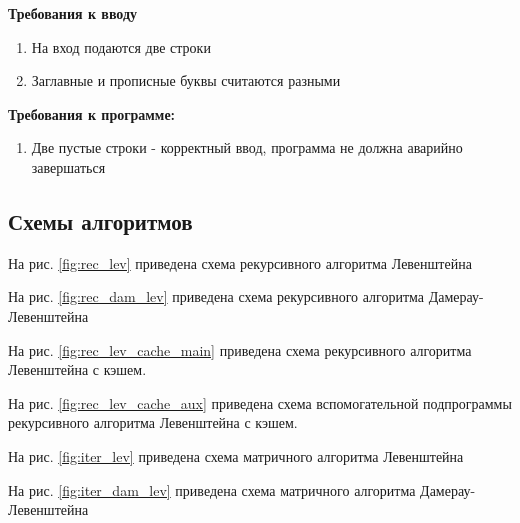 \documentclass[14pt,russian]{scrartcl}
\begin{document}
\textbf{Требования к вводу}
		
\begin{enumerate}
	\item На вход подаются две строки
	\item Заглавные и прописные буквы считаются разными
\end{enumerate}
		
\textbf{Требования к программе:}

\begin{enumerate}
	\item Две пустые строки - корректный ввод, программа не должна аварийно завершаться
\end{enumerate}

\subsection{Схемы алгоритмов}
На рис. \ref{fig:rec_lev} приведена схема рекурсивного алгоритма Левенштейна

На рис. \ref{fig:rec_dam_lev} приведена схема рекурсивного алгоритма Дамерау-Левенштейна

На рис. \ref{fig:rec_lev_cache_main} приведена схема рекурсивного алгоритма Левенштейна с кэшем.

На рис. \ref{fig:rec_lev_cache_aux} приведена схема вспомогательной подпрограммы рекурсивного алгоритма Левенштейна с кэшем.

На рис. \ref{fig:iter_lev} приведена схема матричного алгоритма Левенштейна

На рис. \ref{fig:iter_dam_lev} приведена схема матричного алгоритма Дамерау-Левенштейна
\end{document}
